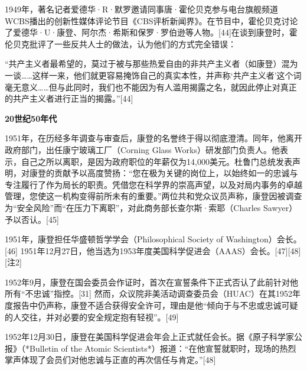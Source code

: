 1949年，著名记者爱德华·R·默罗邀请同事唐·霍伦贝克参与电台旗舰频道WCBS播出的创新性媒体评论节目《CBS评析新闻界》。在节目中，霍伦贝克讨论了爱德华·U·康登、阿尔杰·希斯和保罗·罗伯逊等人物。[44]在谈到康登时，霍伦贝克批评了一些反共人士的做法，认为他们的方式完全错误：

“共产主义者最希望的，莫过于被与那些热爱自由的非共产主义者（如康登）混为一谈……这样一来，他们就更容易掩饰自己的真实本性，并声称‘共产主义者’这个词毫无意义……但与此同时，我们也不能因为有人滥用揭露之名，就因此停止对真正的共产主义者进行正当的揭露。”[44]

\textbf{20世纪50年代}

1951年，在历经多年调查与审查后，康登的名誉终于得以彻底澄清。同年，他离开政府部门，出任康宁玻璃工厂（Corning Glass Works）研发部门负责人。他表示，自己之所以离职，是因为政府职位的年薪仅为14,000美元。杜鲁门总统发表声明，对康登的贡献予以高度赞扬：“您在极为关键的岗位上，以始终如一的忠诚与专注履行了作为局长的职责。凭借您在科学界的崇高声望，以及对局内事务的卓越管理，您使这一机构变得前所未有的重要。”两位共和党众议员声称，康登因被调查为“安全风险”而“在压力下离职”，对此商务部长查尔斯·索耶（Charles Sawyer）予以否认。[45]

1951年，康登担任华盛顿哲学学会（Philosophical Society of Washington）会长。[46] 1951年12月27日，他当选为1953年度美国科学促进会（AAAS）会长。[47][48][注2]

1952年9月，康登在国会委员会作证时，首次在宣誓条件下正式否认了此前针对他所有“不忠诚”指控。[31] 然而，众议院非美活动调查委员会（HUAC）在其1952年度报告中仍声称，康登不适合获得安全许可，理由是他“倾向于与不忠或忠诚可疑的人交往，并对必要的安全规定抱有轻视”。[49]

1952年12月30日，康登在美国科学促进会年会上正式就任会长。据《原子科学家公报》（*Bulletin of the Atomic Scientists*）报道：“在他宣誓就职时，现场的热烈掌声体现了会员们对他忠诚与正直的再次信任与肯定。”[48]
